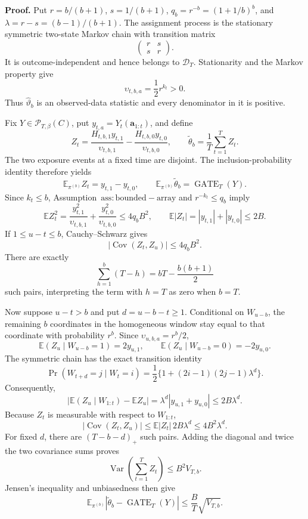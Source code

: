 \textbf{Proof.} Put \(r=b/(b+1)\), \(s=1/(b+1)\), \(q_b=r^{-b}=(1+1/b)^b\), and \(\lambda=r-s=(b-1)/(b+1)\). The assignment process is the stationary symmetric two-state Markov chain with transition matrix
\[
\begin{pmatrix}r&s\\s&r\end{pmatrix}.
\]
It is outcome-independent and hence belongs to \(\mathcal D_T\). Stationarity and the Markov property give
\[
\upsilon_{t,b,a}=\frac12r^{k_t}>0.
\]
Thus \(\widehat\vartheta_b\) is an observed-data statistic and every denominator in it is positive.

Fix \(Y\in\mathcal P_{T,\beta}(C)\), put \(y_{t,a}=Y_t(\mathbf a_{1:t})\), and define
\[
Z_t=\frac{H_{t,b,1}y_{t,1}}{\upsilon_{t,b,1}}-\frac{H_{t,b,0}y_{t,0}}{\upsilon_{t,b,0}},
\qquad
\widetilde\theta_b=\frac1T\sum_{t=1}^T Z_t.
\]
The two exposure events at a fixed time are disjoint. The inclusion-probability identity therefore yields
\[
\mathbb E_{\pi^{(b)}}Z_t=y_{t,1}-y_{t,0},
\qquad
\mathbb E_{\pi^{(b)}}\widetilde\theta_b=\operatorname{GATE}_T(Y).
\]
Since \(k_t\le b\), Assumption~\(\mathrm{ass:bounded-array}\) and \(r^{-k_t}\le q_b\) imply
\[
\mathbb E Z_t^2
=\frac{y_{t,1}^2}{\upsilon_{t,b,1}}+\frac{y_{t,0}^2}{\upsilon_{t,b,0}}
\le4q_bB^2,
\qquad
\mathbb E|Z_t|=|y_{t,1}|+|y_{t,0}|\le2B.
\]
If \(1\le u-t\le b\), Cauchy--Schwarz gives
\[
|\operatorname{Cov}(Z_t,Z_u)|\le4q_bB^2.
\]
There are exactly
\[
\sum_{h=1}^b(T-h)=bT-\frac{b(b+1)}2
\]
such pairs, interpreting the term with \(h=T\) as zero when \(b=T\).

Now suppose \(u-t>b\) and put \(d=u-b-t\ge1\). Conditional on \(W_{u-b}\), the remaining \(b\) coordinates in the homogeneous window stay equal to that coordinate with probability \(r^b\). Since \(\upsilon_{u,b,a}=r^b/2\),
\[
\mathbb E(Z_u\mid W_{u-b}=1)=2y_{u,1},
\qquad
\mathbb E(Z_u\mid W_{u-b}=0)=-2y_{u,0}.
\]
The symmetric chain has the exact transition identity
\[
\Pr(W_{t+d}=j\mid W_t=i)
=\frac12\{1+(2i-1)(2j-1)\lambda^d\}.
\]
Consequently,
\[
\left|\mathbb E(Z_u\mid W_{1:t})-\mathbb EZ_u\right|
=\lambda^d|y_{u,1}+y_{u,0}|
\le2B\lambda^d.
\]
Because \(Z_t\) is measurable with respect to \(W_{1:t}\),
\[
|\operatorname{Cov}(Z_t,Z_u)|
\le \mathbb E|Z_t|\,2B\lambda^d
\le4B^2\lambda^d.
\]
For fixed \(d\), there are \((T-b-d)_+\) such pairs. Adding the diagonal and twice the two covariance sums proves
\[
\operatorname{Var}\left(\sum_{t=1}^T Z_t\right)\le B^2V_{T,b}.
\]
Jensen's inequality and unbiasedness then give
\[
\mathbb E_{\pi^{(b)}}\left|\widetilde\theta_b-\operatorname{GATE}_T(Y)\right|
\le\frac BT\sqrt{V_{T,b}}.
\]

